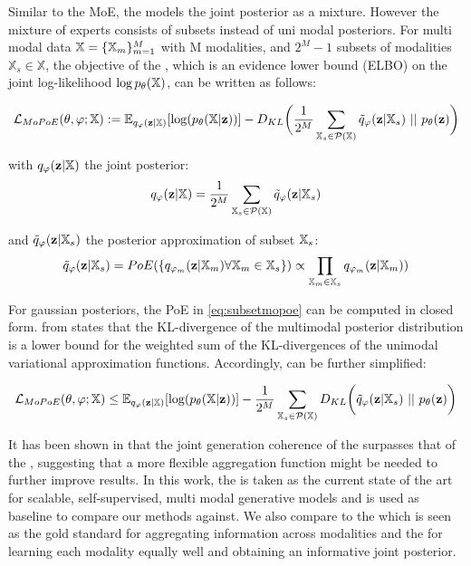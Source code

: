 Similar to the MoE, the  models the joint posterior as a mixture.
However the mixture of experts consists of subsets instead of uni modal posteriors.
For multi modal data $\mathbb{X} = \{ \mathbb{X} _m\}_{m=1}^M$ with M modalities, and $2^M - 1$ subsets of modalities $\mathbb{X}_s \in \mathbb{X}$, the objective of the , which is an evidence lower bound (ELBO) on the joint log-likelihood $\log p_{\theta}(\mathbb{X})$, can be written as follows:

\begin{equation}
    \label{eq:mopoe}
    \mathcal{L}_{MoPoE}(\theta, \varphi; \mathbb{X}):= \mathbb{E}_{q_{\varphi}(\textbf{z}|\mathbb{X})}[\log (p_{\theta}(\mathbb{X}|\textbf{z}))] - D_{KL}\biggl( \frac{1}{2^M} \sum _{\mathbb{X}_s \in \mathcal{P}(\mathbb{X})} \tilde{q}_{\varphi}(\textbf{z}|\mathbb{X}_s)\ ||\ p_{\theta}(\textbf{z})\biggr)
\end{equation}

with $q_{\varphi}(\textbf{z}|\mathbb{X})$ the joint posterior:
\begin{equation}
    q_{\varphi}(\textbf{z}|\mathbb{X}) = \frac{1}{2^M} \sum _{\mathbb{X}_s \in \mathcal{P}(\mathbb{X})} \tilde{q}_{\varphi}(\textbf{z}|\mathbb{X}_s)
\end{equation}

and $\tilde{q}_{\varphi}(\textbf{z}|\mathbb{X}_s)$ the posterior approximation of subset $\mathbb{X}_s$:
\begin{equation}
    \label{eq:subsetmopoe}
    \tilde{q}_{\varphi}(\textbf{z}|\mathbb{X}_s)=PoE(\{q_{\varphi_m}(\textbf{z}|\mathbb{X}_m) \forall \mathbb{X}_m \in \mathbb{X}_s\}) \propto \prod _{\mathbb{X}_m \in \mathbb{X}_s}q_{\varphi_m}(\textbf{z}|\mathbb{X}_m))
\end{equation}

For gaussian posteriors, the PoE in \cref{eq:subsetmopoe} can be computed in closed form.
 from \citep{sutter_multimodal_2020} states that the KL-divergence of the multimodal posterior distribution is a lower bound for the weighted sum of the KL-divergences of the unimodal variational approximation functions.
Accordingly,  can be further simplified:

\begin{equation}
    \label{eq:mopoe_}
    \lmopoe \leq \mathbb{E}_{q_{\phi}(\textbf{z}|\mathbb{X})}[\log (p_{\theta}(\mathbb{X}|\textbf{z}))] - \frac{1}{2^M} \sum _{\mathbb{X}_s \in \mathcal{P}(\mathbb{X})} D_{KL}\biggl( \tilde{q}_{\phi}(\textbf{z}|\mathbb{X}_s)\ ||\ p_{\theta}(\textbf{z})\biggr)
\end{equation}


It has been shown in \citep{sutter_multimodal_2020} that the joint generation coherence of the  surpasses that of the , suggesting that a more flexible aggregation function might be needed to further improve results.
In this work, the  is taken as the current state of the art for scalable, self-supervised, multi modal generative models and is used as baseline to compare our methods against.
We also compare to the  which is seen as the gold standard for aggregating information across modalities and the  for learning each modality equally well and obtaining an informative joint posterior.


